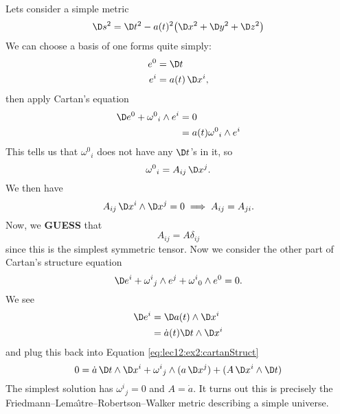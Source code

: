 \begin{ex}
Lets consider a simple metric
\begin{equation}
\D s^{2}=\D t^{2}-a(t)^{2}\bigl(\D x^{2}+\D y^{2}+\D z^{2}\bigr)
\end{equation}
We can choose a basis of one forms quite simply:
\begin{equation}
\begin{split}
e^{0} &= \D t\\
e^{i} &= a(t)\,\D x^{i},
\end{split}
\end{equation}
then apply Cartan's equation
\begin{equation}
\begin{split}
\D e^{0}+{\omega^{0}}_{i}\wedge e^{i}
&=0\\
&=a(t){\omega^{0}}_{i}\wedge e^{i}
\end{split}
\end{equation}
This tells us that ${\omega^{0}}_{i}$ does not have any $\D t$'s
in it, so
\begin{equation}
{\omega^{0}}_{i}=A_{ij}\,\D x^{j}.
\end{equation}
We then have
\begin{equation}
A_{ij}\,\D x^{i}\wedge\D x^{j}=0\implies
A_{ij}=A_{ji}.
\end{equation}
Now, we \textbf{GUESS} that
\begin{equation}
A_{ij}=A\delta_{ij}
\end{equation}
since this is the simplest symmetric tensor. Now we consider the
other part of Cartan's structure equation
\begin{equation}\label{eq:lec12:ex2:cartanStruct}
\D e^{i}+{\omega^{i}}_{j}\wedge e^{j}+{\omega^{i}}_{0}\wedge
e^{0}=0.
\end{equation}
We see
\begin{subequations}
\begin{align}
\D e^{i} &= \D a(t)\wedge \D x^{i}\\
&= \dot{a}(t) \D t\wedge\D x^{i}
\end{align}
\end{subequations}
and plug this back into Equation \eqref{eq:lec12:ex2:cartanStruct}
\begin{equation}
0=\dot{a}\,\D t\wedge\D x^{i}
+{\omega^{i}}_{j}\wedge(a\,\D x^{j})+(A\,\D x^{i}\wedge \D t)
\end{equation}
The simplest solution has ${\omega^{i}}_{j}=0$ and $A=\dot{a}$.
It turns out this is precisely the 
Friedmann--Lema\^\i{}tre--Robertson--Walker
metric describing a simple universe.
\end{ex}

